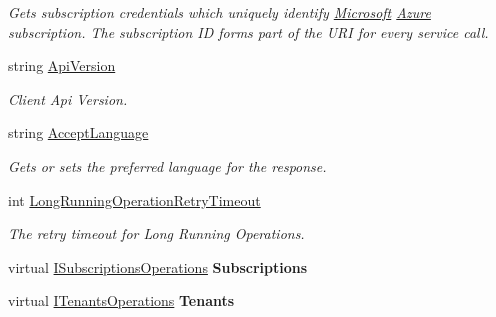 \begin{DoxyCompactItemize}
\begin{DoxyCompactList}\small\item\em Gets subscription credentials which uniquely identify \hyperlink{namespace_microsoft}{Microsoft} \hyperlink{namespace_microsoft_1_1_azure}{Azure} subscription. The subscription ID forms part of the U\+RI for every service call. \end{DoxyCompactList}\item 
string \hyperlink{class_microsoft_1_1_azure_1_1_management_1_1_resources_1_1_subscription_client_abda07afb545fe259d63826a85960c528}{Api\+Version}
\begin{DoxyCompactList}\small\item\em Client Api Version. \end{DoxyCompactList}\item 
string \hyperlink{class_microsoft_1_1_azure_1_1_management_1_1_resources_1_1_subscription_client_a655dec3210244f2c473a2e3201c30189}{Accept\+Language}
\begin{DoxyCompactList}\small\item\em Gets or sets the preferred language for the response. \end{DoxyCompactList}\item 
int \hyperlink{class_microsoft_1_1_azure_1_1_management_1_1_resources_1_1_subscription_client_a0307675c0c36b17fc4ac0e1b2295c3e4}{Long\+Running\+Operation\+Retry\+Timeout}
\begin{DoxyCompactList}\small\item\em The retry timeout for Long Running Operations. \end{DoxyCompactList}\item 
virtual \hyperlink{interface_microsoft_1_1_azure_1_1_management_1_1_resources_1_1_i_subscriptions_operations}{I\+Subscriptions\+Operations} {\bfseries Subscriptions}\hypertarget{class_microsoft_1_1_azure_1_1_management_1_1_resources_1_1_subscription_client_aaaed37d21a575eaf68844f48f693f3bc}{}\label{class_microsoft_1_1_azure_1_1_management_1_1_resources_1_1_subscription_client_aaaed37d21a575eaf68844f48f693f3bc}

\item 
virtual \hyperlink{interface_microsoft_1_1_azure_1_1_management_1_1_resources_1_1_i_tenants_operations}{I\+Tenants\+Operations} {\bfseries Tenants}\hypertarget{class_microsoft_1_1_azure_1_1_management_1_1_resources_1_1_subscription_client_aedff4dfb9c12efb93cf9d1f460c55c52}{}\label{class_microsoft_1_1_azure_1_1_management_1_1_resources_1_1_subscription_client_aedff4dfb9c12efb93cf9d1f460c55c52}

\end{DoxyCompactItemize}


